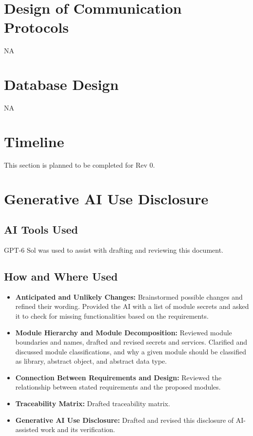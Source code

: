 \documentclass[12pt, titlepage]{article}
\begin{document}
\section{Design of Communication Protocols}

NA

\section{Database Design}

NA

\section{Timeline}

This section is planned to be completed for Rev 0.

\section{Generative AI Use Disclosure}

\subsection{AI Tools Used}

GPT-6 Sol was used to assist with drafting
and reviewing this document.

\subsection{How and Where Used}

\begin{itemize}
\item \textbf{Anticipated and Unlikely Changes:} Brainstormed possible changes
  and refined their wording. Provided the AI with a list of module secrets and
  asked it to check for missing functionalities based on the requirements.
\item \textbf{Module Hierarchy and Module Decomposition:} Reviewed module
  boundaries and names, drafted and revised secrets and services. Clarified and
  discussed module classifications, and why a given module should be classified as library, abstract object, and
  abstract data type.
\item \textbf{Connection Between Requirements and Design:} Reviewed the
  relationship between stated requirements and the proposed modules.
\item \textbf{Traceability Matrix:} Drafted traceability matrix.
\item \textbf{Generative AI Use Disclosure:} Drafted and revised this
  disclosure of AI-assisted work and its verification.
\end{itemize}
\end{document}
